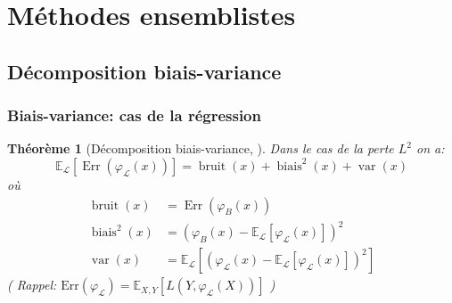\documentclass[dvipsnames,10pt]{beamer}
\theoremstyle{plain}
\newtheorem{theoreme}{Théorème}
\theoremstyle{definition}
\begin{document}
\section{Méthodes ensemblistes}
\subsection{Décomposition biais-variance}

\begin{frame}
\frametitle{Biais-variance: cas de la régression}
\begin{theoreme}[Décomposition biais-variance, \cite{Geman1992}]
    Dans le cas de la perte $L^2$ on a:
    \begin{equation}
        \mathbb{E}_{\mathcal{L}} \left[ \operatorname{Err} ( \varphi_{\mathcal{L}} (x) ) \right] = \operatorname{bruit} (x) + \operatorname{biais}^2 (x) + \operatorname{var} (x)
    \end{equation}
    où
    \begin{align*}
        \operatorname{bruit} (x) &= \operatorname{Err} (\varphi_{B} (x) ) \\
        \operatorname{biais}^2 (x) &= ( \varphi_B (x) - \mathbb{E}_{\mathcal{L}} \left[ \varphi_{\mathcal{L}} (x) \right] )^2 \\
        \operatorname{var} (x) &= \mathbb{E}_{\mathcal{L}} \left[ \left( \varphi_{\mathcal{L}} (x) - \mathbb{E}_{\mathcal{L}} [ \varphi_{\mathcal{L}} (x) ] \right)^2 \right]
    \end{align*}
    ( Rappel: $\mathrm{Err}\left(\varphi_{\mathcal{L}}\right) = \mathbb{E}_{X,Y} \left[ L \left(Y,\varphi_{\mathcal{L}} \left(X \right) \right) \right]$ )
\end{theoreme}
\end{frame}
\end{document}
